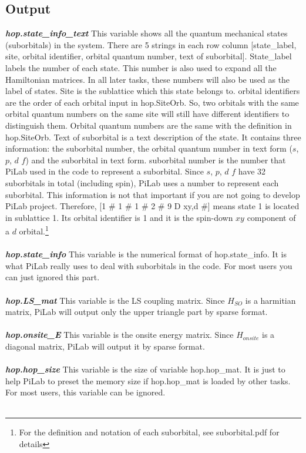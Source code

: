 \documentclass[10pt,a4paper]{article}
\begin{document}
\subsection{Output}
\textit{\textbf{hop.state\_info\_text}} This variable shows all the quantum mechanical states (suborbitals) in the system. There are 5 strings in each row column [state\_label, site, orbital identifier, orbital quantum number, text of suborbital]. State\_label labels the number of each state. This number is also used to expand all the Hamiltonian matrices. In all later tasks, these numbers will also be used as the label of states. Site is the sublattice which this state belongs to. orbital identifiers are the order of each orbital input in hop.SiteOrb. So, two orbitals with the same orbital quantum numbers on the same site will still have different identifiers to distinguish them. Orbital quantum numbers are the same with the definition in hop.SiteOrb. Text of suborbital is a text description of the state. It contains three information: the suborbital number, the orbital quantum number in text form ($s$, $p$, $d$ $f$) and the suborbital in text form. suborbital number is the number that PiLab used in the code to represent a suborbital. Since $s$, $p$, $d$ $f$ have 32 suborbitals in total (including spin), PiLab uses a number to represent each suborbital. This information is not that important if you are not going to develop PiLab project. Therefore, [1 \# 1 \# 1 \# 2 \# 9 D xy,d \#] means state 1 is located in sublattice 1. Its orbital identifier is 1 and it is the spin-down $xy$ component of a $d$ orbital.\footnote{For the definition and notation of each suborbital, see suborbital.pdf for details}  \\ \\
\textit{\textbf{hop.state\_info}} This variable is the numerical format of hop.state\_info. It is what PiLab really uses to deal with suborbitals in the code. For most users you can just ignored this part. \\ \\
\textit{\textbf{hop.LS\_mat}} This variable is the LS coupling matrix. Since $H_{SO}$ is a harmitian matrix, PiLab will output only the upper triangle part by sparse format. \\ \\
\textit{\textbf{hop.onsite\_E}} This variable is the onsite energy matrix. Since $H_{onsite}$ is a diagonal matrix, PiLab will output it by sparse format. \\ \\
\textit{\textbf{hop.hop\_size}} This variable is the size of variable hop.hop\_mat. It is just to help PiLab to preset the memory size if hop.hop\_mat is loaded by other tasks. For most users, this variable can be ignored. \\ \\
\end{document}
